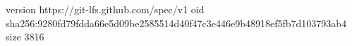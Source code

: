 version https://git-lfs.github.com/spec/v1
oid sha256:9280fd79fdda66e5d09be2585514d40f47c3e446e9b48918ef5fb7d103793ab4
size 3816
